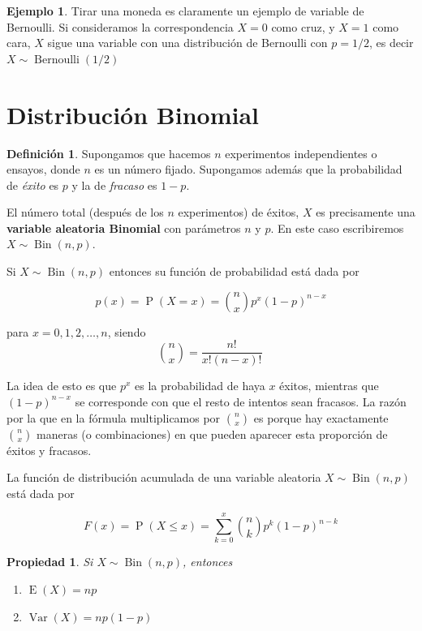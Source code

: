 \documentclass[]{book}
\theoremstyle{plain}
\newtheorem{property}[theorem]{Propiedad}
\theoremstyle{definition}
\newtheorem{definition}[theorem]{Definición}
\newtheorem{example}[theorem]{Ejemplo}
\theoremstyle{definition} %
\begin{document}
\begin{example}

Tirar una moneda es claramente un ejemplo de variable de Bernoulli. Si
consideramos la correspondencia \(X=0\) como cruz, y \(X=1\) como cara,
\(X\) sigue una variable con una distribución de Bernoulli con
\(p=1/2\), es decir
\(\displaystyle X\sim \operatorname {Bernoulli} (1/2)\)
\end{example}


\section{Distribución Binomial} 

\begin{definition}
  
Supongamos que hacemos \(n\) experimentos independientes o ensayos,
donde \(n\) es un número fijado. Supongamos además que la probabilidad
de \emph{éxito} es \(p\) y la de \emph{fracaso} es \(1-p\).

El número total (después de los \(n\) experimentos) de éxitos, \(X\) es
precisamente una \textbf{variable aleatoria Binomial} con parámetros
\(n\) y \(p\). En este caso escribiremos
\(\displaystyle X\sim \operatorname {Bin} (n,p)\).

Si \(\displaystyle X\sim \operatorname {Bin} (n,p)\) entonces su función
de probabilidad está dada por

\[p(x)=\displaystyle \operatorname {P} (X=x)={n \choose x}p^{x}(1-p)^{n-x}\]

para \(\displaystyle x=0,1,2,\dots ,n\), siendo
\[\displaystyle \!{n \choose x}={\frac {n!}{x!(n-x)!}}\,\!\]

La idea de esto es que \(p^x\) es la probabilidad de haya \(x\) éxitos,
mientras que \((1-p)^{n-x}\) se corresponde con que el resto de intentos
sean fracasos. La razón por la que en la fórmula multiplicamos por
\(n \choose x\) es porque hay exactamente \(n \choose x\) maneras (o
combinaciones) en que pueden aparecer esta proporción de éxitos y
fracasos.

La función de distribución acumulada de una variable aleatoria
\(\displaystyle X\sim \operatorname {Bin} (n,p)\) está dada por

\[\displaystyle F(x)=\operatorname {P} (X\leq x)=\sum _{k=0}^{x}{n \choose k}p^{k}(1-p)^{n-k}\]
\end{definition}


\begin{property}
  
Si \(\displaystyle X\sim \operatorname {Bin} (n,p)\), entonces 
\begin{enumerate}[(1)]
  \item $\operatorname {E} (X)=np$
  \item $\operatorname {Var} (X)=np(1-p)$
\end{enumerate}
\end{property}
\end{document}
